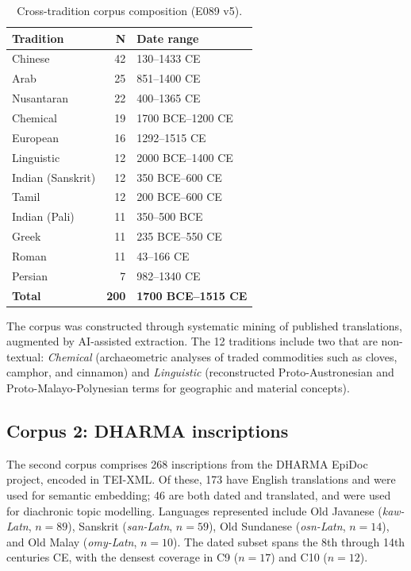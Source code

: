 \documentclass[12pt]{article}
\begin{document}
\begin{table}[htbp]
\centering
\caption{Cross-tradition corpus composition (E089 v5).}
\label{tab:corpus1}
\begin{tabular}{lrl}
\toprule
\textbf{Tradition} & \textbf{N} & \textbf{Date range} \\
\midrule
Chinese     & 42 & 130--1433 CE \\
Arab        & 25 & 851--1400 CE \\
Nusantaran  & 22 & 400--1365 CE \\
Chemical    & 19 & 1700 BCE--1200 CE \\
European    & 16 & 1292--1515 CE \\
Linguistic  & 12 & 2000 BCE--1400 CE \\
Indian (Sanskrit) & 12 & 350 BCE--600 CE \\
Tamil       & 12 & 200 BCE--600 CE \\
Indian (Pali)     & 11 & 350--500 BCE \\
Greek       & 11 & 235 BCE--550 CE \\
Roman       & 11 & 43--166 CE \\
Persian     &  7 & 982--1340 CE \\
\midrule
\textbf{Total} & \textbf{200} & \textbf{1700 BCE--1515 CE} \\
\bottomrule
\end{tabular}
\end{table}

The corpus was constructed through systematic mining of published translations, augmented by AI-assisted extraction.
The 12 traditions include two that are non-textual: \textit{Chemical} (archaeometric analyses of traded commodities such as cloves, camphor, and cinnamon) and \textit{Linguistic} (reconstructed Proto-Austronesian and Proto-Malayo-Polynesian terms for geographic and material concepts).

\subsection{Corpus 2: DHARMA inscriptions}

The second corpus comprises 268 inscriptions from the DHARMA EpiDoc project, encoded in TEI-XML.
Of these, 173 have English translations and were used for semantic embedding; 46 are both dated and translated, and were used for diachronic topic modelling.
Languages represented include Old Javanese (\textit{kaw-Latn}, $n = 89$), Sanskrit (\textit{san-Latn}, $n = 59$), Old Sundanese (\textit{osn-Latn}, $n = 14$), and Old Malay (\textit{omy-Latn}, $n = 10$).
The dated subset spans the 8th through 14th centuries CE, with the densest coverage in C9 ($n = 17$) and C10 ($n = 12$).
\end{document}
